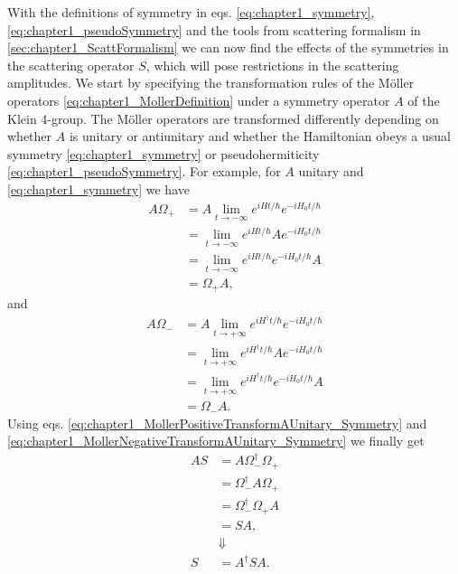 With the definitions of symmetry in eqs. \eqref{eq:chapter1_symmetry}, \eqref{eq:chapter1_pseudoSymmetry} and the tools from scattering formalism in \ref{sec:chapter1_ScattFormalism} we can now find the effects of the symmetries in the scattering operator $S$, which will pose restrictions in the scattering amplitudes. We start by specifying the transformation rules of the M\"{o}ller operators \eqref{eq:chapter1_MollerDefinition} under a symmetry operator $A$ of the Klein 4-group. The M\"{o}ller operators are transformed differently depending on whether $A$ is unitary or antiunitary and whether the Hamiltonian obeys a usual symmetry \eqref{eq:chapter1_symmetry} or pseudohermiticity \eqref{eq:chapter1_pseudoSymmetry}. For example, for $A$ unitary and \eqref{eq:chapter1_symmetry} we have
%
\begin{align}
    A \Omega_+ &= A \lim_{t \to -\infty} e^{i H t/\hbar}e^{-i H_0 t/\hbar}\nonumber\\
    &= \lim_{t \to -\infty}e^{i H t/\hbar}Ae^{-i H_0 t/\hbar}\nonumber\\
    &= \lim_{t \to -\infty} e^{i H t/\hbar}e^{-i H_0 t/\hbar}A\nonumber\\
    &= \Omega_+ A,
  \label{eq:chapter1_MollerPositiveTransformAUnitary_Symmetry}
\end{align}
%
and
%
\begin{align}
    A \Omega_- &= A \lim_{t \to +\infty} e^{i H^\dagger t/\hbar}e^{-i H_0 t/\hbar}\nonumber\\
    &= \lim_{t \to +\infty}e^{i H^\dagger t/\hbar}Ae^{-i H_0 t/\hbar}\nonumber\\
    &= \lim_{t \to +\infty} e^{i H^\dagger t/\hbar}e^{-i H_0 t/\hbar}A\nonumber\\
    &= \Omega_- A.
  \label{eq:chapter1_MollerNegativeTransformAUnitary_Symmetry}
\end{align}
%
Using eqs. \eqref{eq:chapter1_MollerPositiveTransformAUnitary_Symmetry} and \eqref{eq:chapter1_MollerNegativeTransformAUnitary_Symmetry} we finally get
%
\begin{align}
    A S &= A \Omega_{-}^\dagger\Omega_{+}\nonumber \\
    &= \Omega_{-}^\dagger A \Omega_{+}\nonumber \\
    &= \Omega_{-}^\dagger\Omega_{+} A\nonumber \\
    &= S A,\nonumber\\
    &\Downarrow\nonumber\\
    S &= A^{\dagger}SA.
  \label{eq:chapter1_Moller-TransformAUnitary_Symmetry}
\end{align}
